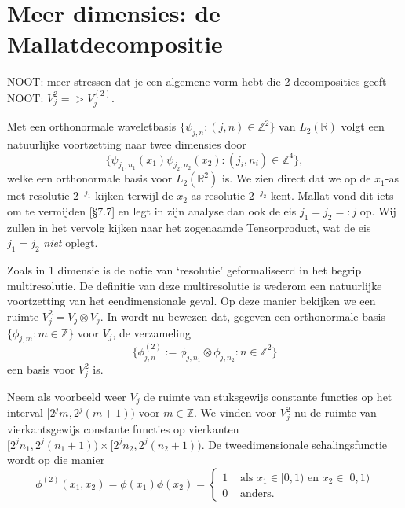\documentclass[11pt]{report}
\newcommand{\R}{\mathbb{R}}
\newcommand{\Z}{\mathbb{Z}}
\theoremstyle{plain}
\theoremstyle{remark}
\begin{document}
\section{Meer dimensies: de Mallatdecompositie}
NOOT: meer stressen dat je een algemene vorm hebt die 2 decomposities geeft
NOOT: $V^2_j => V^{(2)}_j$.

Met een orthonormale waveletbasis $\{ \psi_{j,n}: (j,n) \in \Z^2\}$ van $L_2(\R)$ volgt een natuurlijke voortzetting naar twee dimensies door
\[
  \{ \psi_{j_1,n_1}(x_1) \psi_{j_2,n_2}(x_2): (j_i,n_i) \in \Z^4 \},
\]
welke een orthonormale basis voor $L_2(\R^2)$ is. We zien direct dat we op de $x_1$-as met resolutie $2^{-j_1}$ kijken terwijl de $x_2$-as resolutie $2^{-j_2}$ kent. Mallat vond dit iets om te vermijden \cite{mallat}[\S 7.7] en legt in zijn analyse dan ook de eis $j_1 = j_2 =: j$ op. Wij zullen in het vervolg kijken naar het zogenaamde Tensorproduct, wat de eis $j_1 = j_2$ \emph{niet} oplegt.

Zoals in 1 dimensie is de notie van `resolutie' geformaliseerd in het begrip multiresolutie. De definitie van deze multiresolutie is wederom een natuurlijke voortzetting van het eendimensionale geval. Op deze manier bekijken we een ruimte $V_j^2 = V_j \otimes V_j$. In \cite[\S 7.7]{mallat} wordt nu bewezen dat, gegeven een orthonormale basis $\{ \phi_{j,m}: m \in \Z \}$ voor $V_j$, de verzameling
\[
	\{ \phi^{(2)}_{j,n} := \phi_{j,n_1} \otimes \phi_{j,n_2}: n \in \Z^2 \}
\]
een basis voor $V_j^2$ is.

Neem als voorbeeld weer $V_j$ de ruimte van stuksgewijs constante functies op het interval $[2^j m, 2^j(m+1) )$ voor $m \in \Z$. We vinden voor $V_j^2$ nu de ruimte van vierkantsgewijs constante functies op vierkanten $[2^jn_1, 2^j(n_1+1)) \times [2^jn_2, 2^j(n_2+1))$. De tweedimensionale schalingsfunctie wordt op die manier
\[
	\phi^{(2)}(x_1,x_2) = \phi(x_1)\phi(x_2) = \begin{cases} 1 & \text{ als } x_1 \in [0,1)\text{ en }x_2 \in [0,1) \\ 0 & \text{ anders.} \end{cases}
\]
\end{document}
